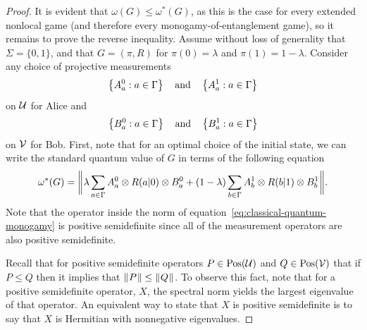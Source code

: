 \begin{proof}
	It is evident that $\omega(G) \leq \omega^*(G)$, as this is the case for every extended nonlocal game (and therefore every monogamy-of-entanglement game), so it remains to prove the reverse inequality. 
	Assume without loss of generality that $\Sigma = \{0,1\}$, and that $G = (\pi,R)$ for $\pi(0) = \lambda$ and $\pi(1) = 1 - \lambda$. Consider any choice of projective measurements 
	\begin{align}
		\left \{ A_a^0 : a \in \Gamma \right \} \quad \textnormal{and} \quad \left \{ A_a^1 : a \in \Gamma  \right \}
	\end{align}
on $\mathcal{U}$ for Alice and 
	\begin{align}
		\left \{ B_a^0 : a \in \Gamma \right \} \quad \textnormal{and} \quad \left \{ B_a^1 : a \in \Gamma \right \}
	\end{align}
on $\mathcal{V}$ for Bob. First, note that for an optimal choice of the initial state, we can write the standard quantum value of $G$ in terms of the following equation 
	\begin{align} \label{eq:classical-quantum-monogamy}
		\omega^*(G) = \biggl\lVert\mspace{1mu} \lambda \sum_{a \in \Gamma} A_a^0 \otimes R(a|0) \otimes B_a^0 + (1-\lambda) \sum_{b \in \Gamma}  A_b^1 \otimes R(b|1) \otimes B_b^1  \mspace{1mu}\biggr\rVert.
	\end{align}
Note that the operator inside the norm of equation~\eqref{eq:classical-quantum-monogamy} is positive semidefinite since all of the measurement operators are also positive semidefinite. 

Recall that for positive semidefinite operators $P \in \mathrm{Pos}(\mathcal{U})$ and $Q \in \mathrm{Pos}(\mathcal{V})$ that if $P \leq Q$ then it implies that $\lVert\mspace{1mu} P \mspace{1mu}\rVert \leq \lVert\mspace{1mu} Q \mspace{1mu}\rVert$. To observe this fact, note that for a positive semidefinite operator, $X$, the spectral norm yields the largest eigenvalue of that operator. An equivalent way to state that $X$ is positive semidefinite is to say that $X$ is Hermitian with nonnegative eigenvalues. 



\end{proof}
